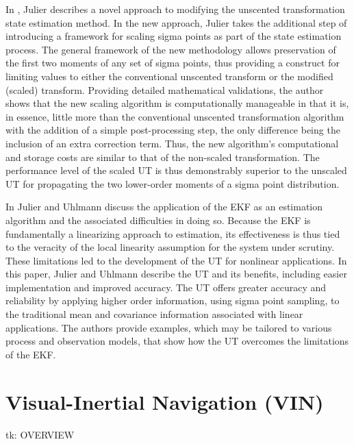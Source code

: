 In \cite{Julier2002}, Julier describes a novel approach to modifying the unscented transformation state estimation method. In the new approach, Julier takes the additional step of introducing a framework for scaling sigma points as part of the state estimation process. The general framework of the new methodology allows preservation of the first two moments of any set of sigma points, thus providing a construct for limiting values to either the conventional unscented transform or the modified (scaled) transform. Providing detailed mathematical validations, the author shows that the new scaling algorithm is computationally manageable in that it is, in essence, little more than the conventional unscented transformation algorithm with the addition of a simple post-processing step, the only difference being the inclusion of an extra correction term. Thus, the new algorithm's computational and storage costs are similar to that of the non-scaled transformation. The performance level of the scaled UT is thus demonstrably superior to the unscaled UT for propagating the two lower-order moments of a sigma point distribution.

In \cite{Julier2004} Julier and Uhlmann discuss the application of the EKF as an estimation algorithm and the associated difficulties in doing so. Because the EKF is fundamentally a linearizing approach to estimation, its effectiveness is thus tied to the veracity of the local linearity assumption for the system under scrutiny. These limitations led to the development of the UT for nonlinear applications. In this paper, Julier and Uhlmann describe the UT and its benefits, including easier implementation and improved accuracy. The UT offers greater accuracy and reliability by applying higher order information, using sigma point sampling, to the traditional mean and covariance information associated with linear applications. The authors provide examples, which may be tailored to various process and observation models, that show how the UT overcomes the limitations of the EKF.

\section{Visual-Inertial Navigation (VIN)}

tk: OVERVIEW

